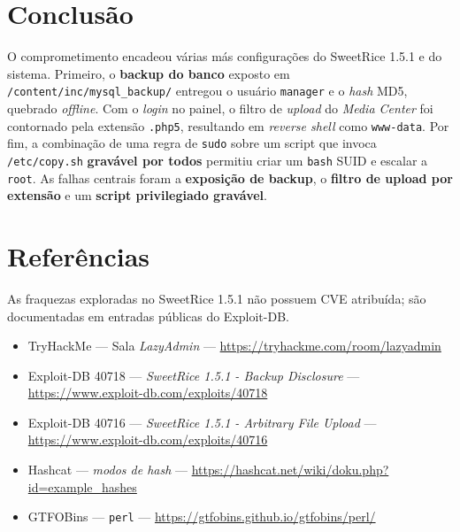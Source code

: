 \documentclass[12pt,a4paper]{article}
\begin{document}
\section{Conclusão}
O comprometimento encadeou várias más configurações do SweetRice 1.5.1 e do
sistema. Primeiro, o \textbf{backup do banco} exposto em
\texttt{/content/inc/mysql\_backup/} entregou o usuário \texttt{manager} e o
\emph{hash} MD5, quebrado \emph{offline}. Com o \emph{login} no painel, o filtro
de \emph{upload} do \emph{Media Center} foi contornado pela extensão
\texttt{.php5}, resultando em \emph{reverse shell} como \texttt{www-data}. Por
fim, a combinação de uma regra de \texttt{sudo} sobre um script que invoca
\texttt{/etc/copy.sh} \textbf{gravável por todos} permitiu criar um \texttt{bash}
SUID e escalar a \texttt{root}. As falhas centrais foram a \textbf{exposição de
backup}, o \textbf{filtro de upload por extensão} e um \textbf{script privilegiado
gravável}.

\section{Referências}
As fraquezas exploradas no SweetRice 1.5.1 não possuem CVE atribuída; são
documentadas em entradas públicas do Exploit-DB.
\begin{itemize}[leftmargin=1.5em]
  \item TryHackMe --- Sala \emph{LazyAdmin} ---
        \url{https://tryhackme.com/room/lazyadmin}
  \item Exploit-DB 40718 --- \emph{SweetRice 1.5.1 - Backup Disclosure} ---
        \url{https://www.exploit-db.com/exploits/40718}
  \item Exploit-DB 40716 --- \emph{SweetRice 1.5.1 - Arbitrary File Upload} ---
        \url{https://www.exploit-db.com/exploits/40716}
  \item Hashcat --- \emph{modos de hash} ---
        \url{https://hashcat.net/wiki/doku.php?id=example_hashes}
  \item GTFOBins --- \texttt{perl} ---
        \url{https://gtfobins.github.io/gtfobins/perl/}
\end{itemize}
\end{document}
